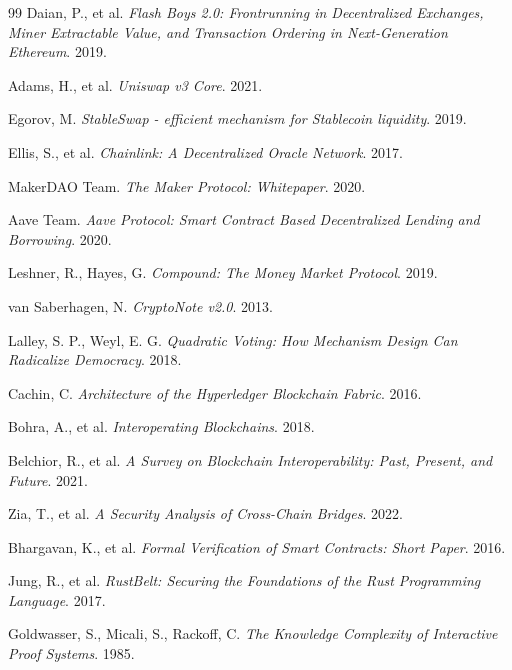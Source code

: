 \documentclass[11pt,a4paper]{article}
\begin{document}
\begin{thebibliography}{99}
Daian, P., et al. \textit{Flash Boys 2.0: Frontrunning in Decentralized Exchanges, Miner Extractable Value, and Transaction Ordering in Next-Generation Ethereum}. 2019.

Adams, H., et al. \textit{Uniswap v3 Core}. 2021.

Egorov, M. \textit{StableSwap - efficient mechanism for Stablecoin liquidity}. 2019.

Ellis, S., et al. \textit{Chainlink: A Decentralized Oracle Network}. 2017.

MakerDAO Team. \textit{The Maker Protocol: Whitepaper}. 2020.

Aave Team. \textit{Aave Protocol: Smart Contract Based Decentralized Lending and Borrowing}. 2020.

Leshner, R., Hayes, G. \textit{Compound: The Money Market Protocol}. 2019.

van Saberhagen, N. \textit{CryptoNote v2.0}. 2013.

Lalley, S. P., Weyl, E. G. \textit{Quadratic Voting: How Mechanism Design Can Radicalize Democracy}. 2018.

Cachin, C. \textit{Architecture of the Hyperledger Blockchain Fabric}. 2016.

Bohra, A., et al. \textit{Interoperating Blockchains}. 2018.

Belchior, R., et al. \textit{A Survey on Blockchain Interoperability: Past, Present, and Future}. 2021.

Zia, T., et al. \textit{A Security Analysis of Cross-Chain Bridges}. 2022.

Bhargavan, K., et al. \textit{Formal Verification of Smart Contracts: Short Paper}. 2016.

Jung, R., et al. \textit{RustBelt: Securing the Foundations of the Rust Programming Language}. 2017.

Goldwasser, S., Micali, S., Rackoff, C. \textit{The Knowledge Complexity of Interactive Proof Systems}. 1985.

\end{thebibliography}
\end{document}
